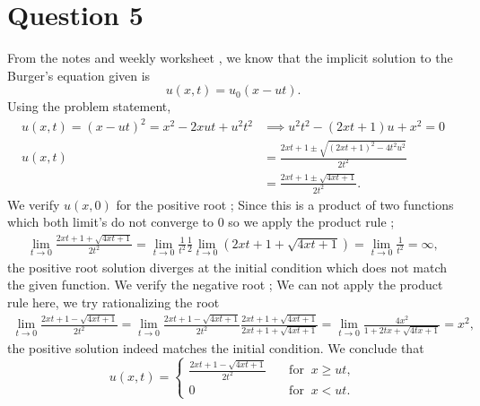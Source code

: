 \documentclass[12pt]{article}
\theoremstyle{definition}
\theoremstyle{definition}
\theoremstyle{definition}
\theoremstyle{definition}
\theoremstyle{definition}
\theoremstyle{example}
\theoremstyle{note}
\theoremstyle{remark}
\theoremstyle{example}
\begin{document}
		\section*{Question 5}
			From the notes and weekly worksheet , we know that the implicit solution to the Burger's equation given is 
			$$ u(x,t) = u_{0}(x - ut).$$
			Using the problem statement, 
			\begin{align*}
				u(x,t) = (x-ut)^{2} = x^{2} -2xut + u^{2}t^{2} &\implies  u^{2} t^{2} -(2xt +1) u +x^{2} =0 \\
				 u(x,t) &= \frac{2xt+1 \pm \sqrt{(2xt+1)^{2} -4t^{2}u^{2}}}{2t^{2}} \\
				&= \frac{2xt+1 \pm \sqrt{4xt +1}}{2t^{2}}.
			\end{align*}
			We verify $u(x,0)$ for the positive root ; Since this is a product of two functions which both limit's do not converge to $0$ so we apply the product rule ;
			\begin{align*}
				\lim\limits_{t \to 0} \frac{2xt+1 + \sqrt{4xt +1}}{2t^{2}}  = \lim\limits_{t \to 0} \frac{1}{t^{2}} \frac12 \lim\limits_{t \to 0} (2xt+1 + \sqrt{4xt +1}) = \lim\limits_{t \to 0 } \frac{1}{t^{2}} = \infty,
			\end{align*}
			the positive root solution diverges at the initial condition which does not match the given function. We verify the negative root ; We can not apply the product rule here, we try rationalizing the root
			\begin{align*}
				 \lim\limits_{t \to 0 } \frac{2xt+1 - \sqrt{4xt +1}}{2t^{2}} = \lim\limits_{t \to 0}\frac{2xt+1 - \sqrt{4xt +1}}{2t^{2}} \frac{2xt +1 + \sqrt{4xt +1}}{2xt +1 + \sqrt{4xt +1}} = \lim\limits_{t \to 0} \frac{4x^{2}}{1 + 2tx + \sqrt{4tx +1}} = x^{2},
			\end{align*}
			the positive solution indeed matches the initial condition. We conclude that 
			$$ u(x,t) =
			    \begin{cases} 
					\frac{2xt+1 - \sqrt{4xt +1}}{2t^{2}} \quad &\text{for }\ x \ge ut ,\\
					0 \quad &\text{for }\ x < ut.	
				\end{cases}$$
	
\end{document}
